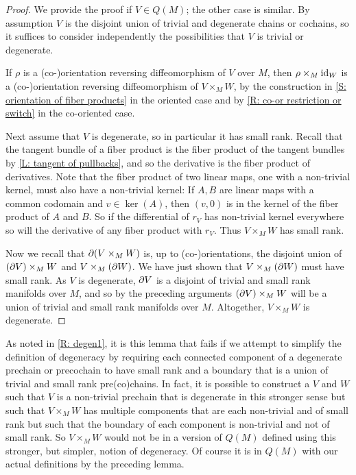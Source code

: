 \begin{proof}
	We provide the proof if $V \in Q(M)$; the other case is similar.
	By assumption $V$ is the disjoint union of trivial and degenerate chains or cochains, so it suffices to consider independently the possibilities that $V$ is trivial or degenerate.

	If $\rho$ is a (co-)orientation reversing diffeomorphism of $V$ over $M$, then $\rho \times_M \mathrm{id}_W$ is a (co-)orientation reversing diffeomorphism of $V \times_M W$, by the construction in \cref{S: orientation of fiber products} in the oriented case and by \cref{R: co-or restriction or switch} in the co-oriented case.

	Next assume that $V$ is degenerate, so in particular it has small rank.
	Recall that the tangent bundle of a fiber product is the fiber product of the tangent bundles by \cref{L: tangent of pullbacks}, and so the derivative is the fiber product of derivatives.
	Note that the fiber product of two linear maps, one with a non-trivial kernel, must also have a non-trivial kernel: If $A,B$ are linear maps with a common codomain and $v \in \ker(A)$, then $(v,0)$ is in the kernel of the fiber product of $A$ and $B$.
	So if the differential of $r_V$ has non-trivial kernel everywhere so will the derivative of any fiber product with $r_V$.
	Thus $V \times_M W$ has small rank.

	Now we recall that $\partial(V \times_M W)$ is, up to (co-)orientations, the disjoint union of $(\partial V) \times_M W$ and $V \times_M (\partial W)$.
	We have just shown that $V \times_M (\partial W)$ must have small rank.
	As $V$ is degenerate, $\partial V$ is a disjoint of trivial and small rank manifolds over $M$, and so by the preceding arguments $(\partial V) \times_M W$ will be a union of trivial and small rank manifolds over $M$.
	Altogether, $V \times_M W$ is degenerate.
\end{proof}

\begin{remark}\label{R: degen2}
	As noted in \cref{R: degen1}, it is this lemma that fails if we attempt to simplify the definition of degeneracy by requiring each connected component of a degenerate prechain or precochain to have small rank and a boundary that is a union of trivial and small rank pre(co)chains.
	In fact, it is possible to construct a $V$ and $W$ such that $V$ is a non-trivial prechain that is degenerate in this stronger sense but such that $V \times_M W$ has multiple components that are each non-trivial and of small rank but such that the boundary of each component is non-trivial and not of small rank.
	So $V \times_M W$ would not be in a version of $Q(M)$ defined using this stronger, but simpler, notion of degeneracy.
	Of course it is in $Q(M)$ with our actual definitions by the preceding lemma.
\end{remark}

